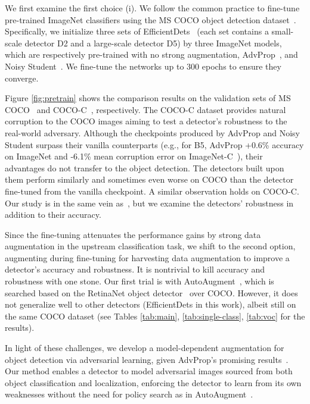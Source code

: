 \documentclass[final]{cvpr}
\begin{document}
We first examine the first choice (i). We follow the common practice to fine-tune pre-trained ImageNet classifiers using the MS COCO object detection dataset~\cite{lin2015coco}. Specifically, we initialize three sets of EfficientDets~\cite{tan2020edet} (each set contains a small-scale detector D2 and a large-scale detector D5) by three ImageNet models, which are respectively pre-trained with no strong augmentation, AdvProp~\cite{xie2020advprop}, and Noisy Student~\cite{xie2020self}. We fine-tune the networks up to 300 epochs to ensure they converge. 

Figure \ref{fig:pretrain} shows the comparison results on the validation sets of MS COCO~\cite{lin2015coco} and COCO-C~\cite{michaelis2020benchmarking}, respectively. The COCO-C dataset provides natural corruption to the COCO images aiming to test a detector's robustness to the real-world adversary. Although the checkpoints produced by AdvProp and Noisy Student surpass their vanilla counterparts (e.g., for B5, AdvProp +0.6\% accuracy on ImageNet and -6.1\% mean corruption error on ImageNet-C~\cite{hendrycks2018benchmarking}), their advantages do not transfer to the object detection.
The detectors built upon them perform similarly and sometimes even worse on COCO than the detector fine-tuned from the vanilla checkpoint. A similar observation holds on COCO-C. Our study is in the same vein as~\cite{he2019rethinking}, but we examine the detectors' robustness in addition to their accuracy.





Since the fine-tuning attenuates the performance gains by strong data augmentation in the upstream classification task, we shift to the second option, 
augmenting during fine-tuning for harvesting data augmentation to improve a detector's accuracy and robustness. It is nontrivial to kill accuracy and robustness with one stone. 
Our first trial is with AutoAugment~\cite{zoph2019learning}, which is searched based on the RetinaNet object detector~\cite{lin2017focal} over COCO. However, it does not generalize well to other detectors (EfficientDets in this work), albeit still on the same COCO dataset (see Tables \ref{tab:main}, \ref{tab:single-class}, \ref{tab:voc} for the results). 


In light of these challenges, we develop a model-dependent augmentation for object detection via adversarial learning, given AdvProp's promising results~\cite{xie2020advprop}. Our method enables a detector to model adversarial images sourced from both object classification and localization, enforcing the detector to learn from its own weaknesses without the need for policy search as in AutoAugment~\cite{zoph2019learning}. 
\end{document}
